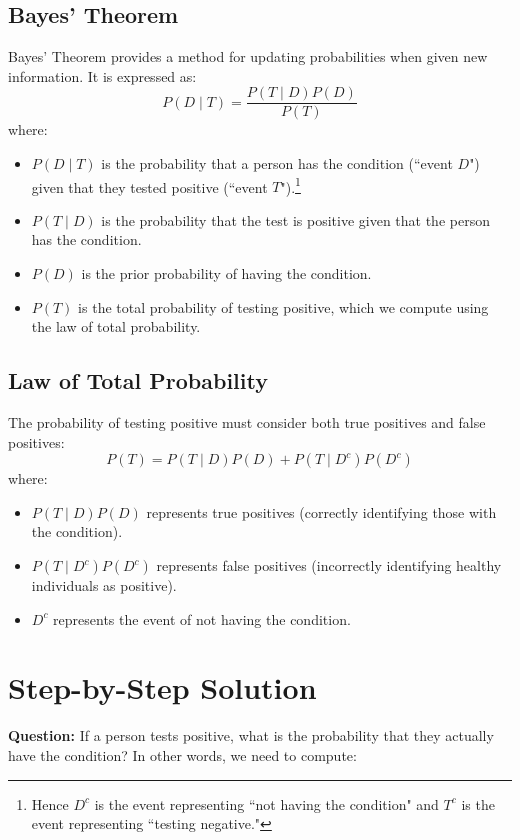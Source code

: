 \documentclass{article}
\begin{document}
\subsection{Bayes' Theorem}
Bayes' Theorem provides a method for updating probabilities when given new information. It is expressed as:
\begin{equation}
    P(D \mid T) = \frac{P(T \mid D) P(D)}{P(T)}
\end{equation}
where:
\begin{itemize}
    \item $P(D \mid T)$ is the probability that a person has the condition (``event $D$") given that they tested positive (``event $T$").\footnote{Hence $D^c$ is the event representing ``not having the condition" and $T^c$ is the event representing ``testing negative."}
    \item $P(T \mid D)$ is the probability that the test is positive given that the person has the condition.
    \item $P(D)$ is the prior probability of having the condition.
    \item $P(T)$ is the total probability of testing positive, which we compute using the law of total probability.
\end{itemize}

\subsection{Law of Total Probability}
The probability of testing positive must consider both true positives and false positives:
\begin{equation}
    P(T) = P(T \mid D) P(D) + P(T \mid D^c) P(D^c)
\end{equation}
where:
\begin{itemize}
    \item $P(T \mid D) P(D)$ represents true positives (correctly identifying those with the condition).
    \item $P(T \mid D^c) P(D^c)$ represents false positives (incorrectly identifying healthy individuals as positive).
    \item $D^c$ represents the event of not having the condition.
\end{itemize}

\section{Step-by-Step Solution}

\textbf{Question:} If a person tests positive, what is the probability that they actually have the condition? In other words, we need to compute:
\end{document}
